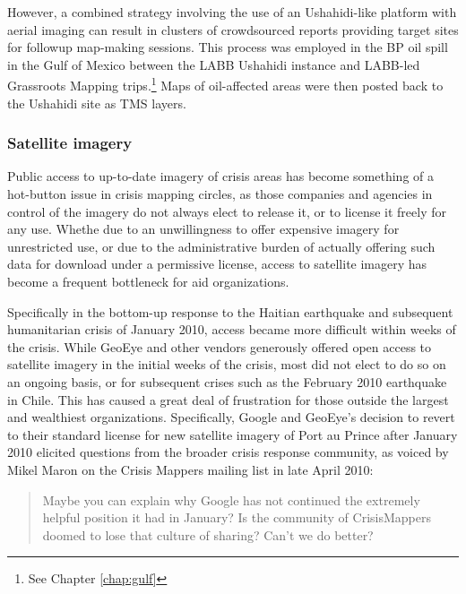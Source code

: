 \documentclass[11pt,oneside,notitlepage]{report}
\begin{document}
However, a combined strategy involving the use of an Ushahidi-like platform with aerial imaging can result in clusters of crowdsourced reports providing target sites for followup map-making sessions. This process was employed in the BP oil spill in the Gulf of Mexico between the \ac{LABB} Ushahidi instance and \ac{LABB}-led Grassroots Mapping trips.\footnote{See Chapter \ref{chap:gulf}} Maps of oil-affected areas were then posted back to the Ushahidi site as \ac{TMS} layers.


\subsubsection{Satellite imagery}
\label{subsec:satelliterelease}

Public access to up-to-date imagery of crisis areas has become something of a hot-button issue in crisis mapping circles, as those companies and agencies in control of the imagery do not always elect to release it, or to license it freely for any use. Whethe due to an unwillingness to offer expensive imagery for unrestricted use, or due to the administrative burden of actually offering such data for download under a permissive license, access to satellite imagery has become a frequent bottleneck for aid organizations. 

Specifically in the bottom-up response to the Haitian earthquake and subsequent humanitarian crisis of January 2010, access became more difficult within weeks of the crisis. While GeoEye and other vendors generously offered open access to satellite imagery in the initial weeks of the crisis, most did not elect to do so on an ongoing basis, or for subsequent crises such as the February 2010 earthquake in Chile. This has caused a great deal of frustration for those outside the largest and wealthiest organizations. Specifically, Google and GeoEye's decision to revert to their standard license for new satellite imagery of Port au Prince after January 2010 elicited questions from the broader crisis response community, as voiced by Mikel Maron on the Crisis Mappers mailing list in late April 2010:

\begin{quote}
Maybe you can explain why Google has not continued the extremely helpful position it had in January?
Is the community of CrisisMappers doomed to lose that culture of sharing? Can't we do better?
\end{quote}
\end{document}
